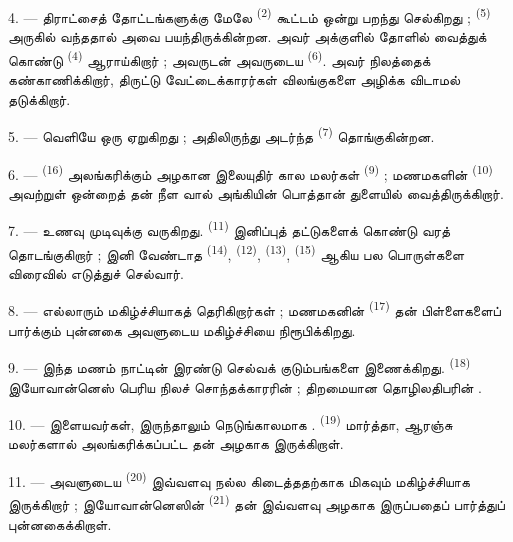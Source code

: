 4. --- திராட்சைத் தோட்டங்களுக்கு மேலே 
\textsuperscript{(2)} கூட்டம் ஒன்று பறந்து செல்கிறது ;  \textsuperscript{(5)} அருகில் வந்ததால் அவை பயந்திருக்கின்றன. அவர்
அக்குளில்  தோளில் 
வைத்துக் கொண்டு  \textsuperscript{(4)}
ஆராய்கிறார் ; அவருடன் அவருடைய  \textsuperscript{(6)}. அவர்
நிலத்தைக் கண்காணிக்கிறார், திருட்டு வேட்டைக்காரர்கள் விலங்குகளை
அழிக்க விடாமல் தடுக்கிறார்.

5. ---  வெளியே ஒரு 
ஏறுகிறது ; அதிலிருந்து அடர்ந்த 
\textsuperscript{(7)} தொங்குகின்றன.

6. ---  \textsuperscript{(16)} அலங்கரிக்கும் அழகான இலையுதிர்
கால மலர்கள்  \textsuperscript{(9)} ; மணமகளின்
 \textsuperscript{(10)} அவற்றுள் ஒன்றைத் தன் நீள வால்
அங்கியின் பொத்தான் துளையில் வைத்திருக்கிறார்.

7. --- உணவு முடிவுக்கு வருகிறது.  \textsuperscript{(11)}
இனிப்புத் தட்டுகளைக் கொண்டு வரத் தொடங்குகிறார் ; இனி வேண்டாத
 \textsuperscript{(14)}, 
\textsuperscript{(12)},  \textsuperscript{(13)},
 \textsuperscript{(15)} ஆகிய பல பொருள்களை விரைவில்
எடுத்துச் செல்வார்.

\VUsaut{3.0mm}

8. --- எல்லாரும் மகிழ்ச்சியாகத் தெரிகிறார்கள் ; மணமகனின் 
\textsuperscript{(17)} தன் பிள்ளைகளைப் பார்க்கும் புன்னகை அவளுடைய
மகிழ்ச்சியை நிரூபிக்கிறது.

9. --- இந்த மணம் நாட்டின் இரண்டு செல்வக் குடும்பங்களை இணைக்கிறது.
 \textsuperscript{(18)} இயோவான்னெஸ் பெரிய நிலச் சொந்தக்காரரின்
 ; திறமையான தொழிலதிபரின் .

10. ---  இளையவர்கள், இருந்தாலும் நெடுங்காலமாக
. 
\textsuperscript{(19)} மார்த்தா, ஆரஞ்சு மலர்களால் அலங்கரிக்கப்பட்ட தன்
 அழகாக இருக்கிறாள்.

11. --- அவளுடைய  \textsuperscript{(20)} இவ்வளவு நல்ல
 கிடைத்ததற்காக மிகவும் மகிழ்ச்சியாக இருக்கிறார் ;
இயோவான்னெஸின்  \textsuperscript{(21)} தன் 
இவ்வளவு அழகாக இருப்பதைப் பார்த்துப் புன்னகைக்கிறாள்.

